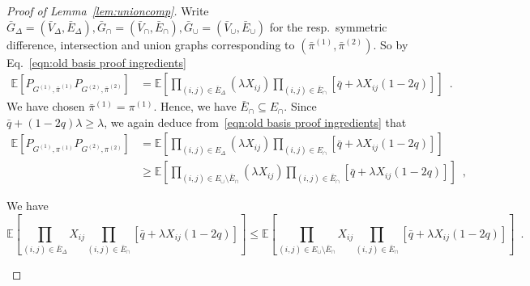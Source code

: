 \documentclass[final]{colt2026}
\newcommand{\1}{\mathbf{1}}
\newcommand{\alex}[1]{\textcolor{magenta}{[alex: #1]}}
\newcommand{\bbE}{\mathbb{E}}
\newcommand{\cro}[1]{\left[#1\right]}
\begin{document}
\begin{proof}[Proof of Lemma~\ref{lem:unioncomp}]
Write $\bar G_\Delta = (\bar V_\Delta, \bar E_\Delta), \bar G_\cap=(\bar V_\cap, \bar E_\cap),  \bar G_\cup=(\bar V_\cup, \bar E_\cup)$ for the resp.~symmetric difference, intersection and union graphs corresponding to $(\bar \pi^{(1)}, \bar \pi^{(2)})$.
So  by Eq.~\eqref{eqn:old basis proof ingredients}
\begin{align}\label{eq:coolio2}
    \mathbb E\left[P_{G^{(1)}, \bar \pi^{(1)}}P_{G^{(2)}, \bar \pi^{(2)}}\right]& = \bbE\cro{\prod_{(i,j)\in \bar E_{\Delta}} (\lambda X_{ij}) \prod_{(i,j)\in  \bar E_{\cap}}[\bar q+\lambda X_{ij}(1-2q)]}\enspace  . 
\end{align}
We have chosen $\bar \pi^{(1)} = \pi^{(1)}$. Hence, we have $\bar E_\cap \subseteq E_\cap$. 
Since $\bar q+(1-2q)\lambda \geq \lambda$, we again deduce from~\eqref{eqn:old basis proof ingredients} that 
\begin{align}
   \mathbb{E}\left[P_{G^{(1)}, \pi^{(1)}}P_{G^{(2)}, \pi^{(2)}}\right] 
    &= \bbE\cro{\prod_{(i,j)\in E_{\Delta}} (\lambda X_{ij}) \prod_{(i,j)\in E_{\cap}}[\bar q+\lambda X_{ij}(1-2q)]} \nonumber \\ 
   &\geq   \bbE\cro{\prod_{(i,j)\in E_{\cup}\setminus \bar E_\cap} (\lambda X_{ij})\prod_{(i,j)\in  \bar E_{\cap}}[\bar q+\lambda X_{ij}(1-2q)]}\enspace , 
    \label{eq:coolio0}   
\end{align}


\begin{lemma}\label{lem:ineqsbm}
We have%
$$\bbE\cro{\prod_{(i,j)\in  \bar E_{\Delta}} X_{ij} \prod_{(i,j)\in  \bar E_{\cap}}[\bar q+\lambda X_{ij}(1-2q)]} \leq \bbE\cro{\prod_{(i,j)\in E_{\cup} \setminus \bar E_\cap} X_{ij}\prod_{(i,j)\in  \bar E_{\cap}}[\bar q+\lambda X_{ij}(1-2q)]}\enspace .$$    
\end{lemma}




\end{proof}
\end{document}
